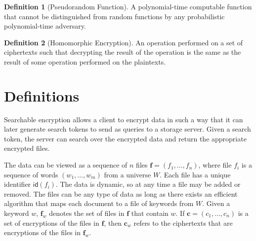 \documentclass[12pt,a4paper]{article}
\theoremstyle{definition}
\newtheorem{definition}{Definition}
\begin{document}
\begin{definition}[Pseudorandom Function]
A polynomial-time computable function that cannot be distinguished from random
functions by any probabilistic polynomial-time adversary.
\end{definition}


\begin{definition}[Homomorphic Encryption]
An operation performed on a set of ciphertexts such that decrypting
the result of the operation is the same as the result of some operation
performed on the plaintexts.
\end{definition}
\clearpage


\section{Definitions}

Searchable encryption allows a client to encrypt data in such a way that
it can later generate search tokens to send as queries to a storage
server. Given a search token, the server can search over the encrypted data
and return the appropriate encrypted files.

The data can be viewed as a sequence of \(n\) files
\(\mathbf{f} = (f_1, \dotsc, f_n)\), where file \(f_i\) is a sequence of words
\((w_1, \dotsc, w_m)\) from a universe \(W\). Each file
has a unique identifier \(\mathsf{id}(f_i)\). The data is dynamic, so at
any time a file may be added or removed. The files can be any type of data as
long as there exists an efficient algorithm that maps each document to a
file of keywords from \(W\). Given a
keyword \(w\), \(\mathbf{f}_w\) denotes the set of files in \(\mathbf{f}\)
that contain \(w\). If \(\mathbf{c} = (c_1 ,\dotsc, c_n)\) is a set of
encryptions of the files in \(\mathbf{f}\), then \(\mathbf{c}_w\) refers
to the ciphertexts that are encryptions of the files in \(\mathbf{f}_w\).
\end{document}
